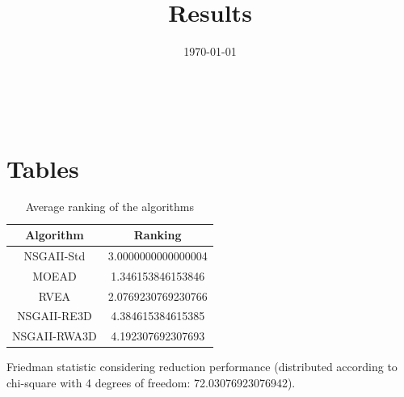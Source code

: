 \documentclass{article}
\title{Results}
\author{}
\date{\today}
\begin{document}
\oddsidemargin 0in \topmargin 0in\maketitle
\
\section{Tables}
\begin{table}[!htp]
\centering
\caption{Average ranking of the algorithms}
\begin{tabular}{c|c}
Algorithm&Ranking\\
\hline
NSGAII-Std&3.0000000000000004\\
MOEAD&1.346153846153846\\
RVEA&2.0769230769230766\\
NSGAII-RE3D&4.384615384615385\\
NSGAII-RWA3D&4.192307692307693\\
\end{tabular}
\end{table}


Friedman statistic considering reduction performance (distributed according to chi-square with 4 degrees of freedom: 72.03076923076942).
\end{document}

